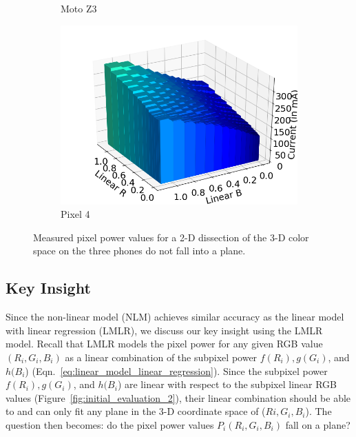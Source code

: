 \begin{figure}[tp]
\begin{subfigure}[]{0.28\textwidth}
		\caption{Moto Z3}
		\label{fig:initial_monotonicity_p2_w}
	\end{subfigure}
	\hfill
	\begin{subfigure}[]{0.28\textwidth}
		\includegraphics[width=\textwidth]{figure/004_Pixel4_monotonicity_cube.png}
		\caption{Pixel 4}
		\label{fig:initial_monotonicity_z3_w}
	\end{subfigure}
	\hfill
        \vspace{-0.1in}
	\caption{Measured pixel power values for a 2-D dissection of the 3-D color space on the three phones do not fall into a plane.}
\label{fig:initial_monotonicity}
\end{figure}


\subsection{Key Insight}

Since the non-linear model (NLM) achieves similar accuracy as the linear model
with linear regression (LMLR), 
we discuss our key insight using the
LMLR model.
Recall that LMLR models the pixel power for any given RGB value
$(R_i, G_i,B_i)$ as a linear combination of the subpixel power 
$f(R_{i}), g(G_i)$, and $h(B_i$) (Eqn.~\ref{eq:linear_model_linear_regression}).
Since the subpixel power $f(R_{i}), g(G_i)$, and $h(B_i$) are linear
with respect to the subpixel linear RGB values
(Figure~\ref{fig:initial_evaluation_2}), their linear combination
should be able to and can only fit any plane in the 3-D coordinate space of
($Ri, G_i, B_i$). The question then becomes: do the pixel power values
$P_i(R_i, G_i,B_i)$ fall on a plane?

